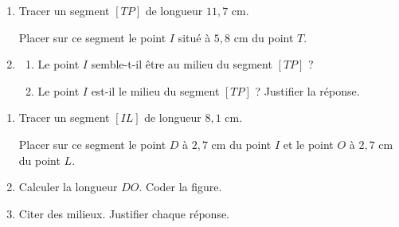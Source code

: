 \documentclass[a4paper,10pt]{report}
\begin{document}
\begin{ex}

\medskip
\begin{enumerate}
\item Tracer un segment $[TP]$ de longueur $11,7$ cm. 

Placer sur ce segment le point $I$ situé à $5,8$ cm du point $T$.
\item \begin{enumerate}
\item Le point $I$ semble-t-il être au milieu du segment $[TP]$ ?
\item Le point $I$ est-il le milieu du segment $[TP]$ ? Justifier la réponse.
\end{enumerate}
\end{enumerate}
\end{ex}

\begin{ex}

\medskip
\begin{enumerate}
\item Tracer un segment $[IL]$ de longueur $8,1$ cm. 

Placer sur ce segment le point $D$ à $2,7$ cm du point $I$ et le point $O$ à $2,7$ cm du point $L$.
\item Calculer la longueur $DO$. Coder la figure.
\item Citer des milieux. Justifier chaque réponse.
\end{enumerate}
\end{ex}
\end{document}
